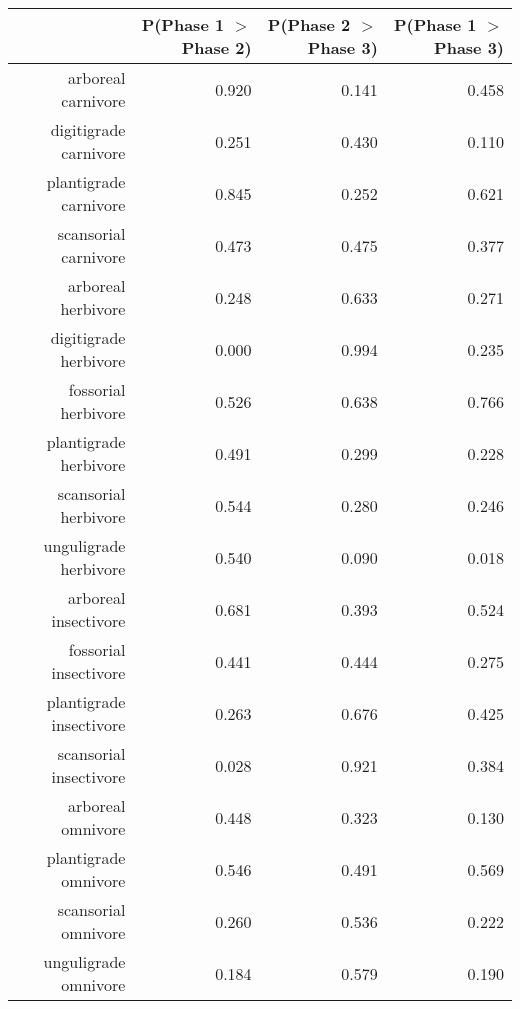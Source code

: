 \begin{table}[ht]
\centering
\begin{tabular}{rrrr}
  \hline
 & P(Phase 1 $>$ Phase 2) & P(Phase 2 $>$ Phase 3) & P(Phase 1 $>$ Phase 3) \\ 
  \hline
arboreal carnivore & 0.920 & 0.141 & 0.458 \\ 
  digitigrade carnivore & 0.251 & 0.430 & 0.110 \\ 
  plantigrade carnivore & 0.845 & 0.252 & 0.621 \\ 
  scansorial carnivore & 0.473 & 0.475 & 0.377 \\ 
  arboreal herbivore & 0.248 & 0.633 & 0.271 \\ 
  digitigrade herbivore & 0.000 & 0.994 & 0.235 \\ 
  fossorial herbivore & 0.526 & 0.638 & 0.766 \\ 
  plantigrade herbivore & 0.491 & 0.299 & 0.228 \\ 
  scansorial herbivore & 0.544 & 0.280 & 0.246 \\ 
  unguligrade herbivore & 0.540 & 0.090 & 0.018 \\ 
  arboreal insectivore & 0.681 & 0.393 & 0.524 \\ 
  fossorial insectivore & 0.441 & 0.444 & 0.275 \\ 
  plantigrade insectivore & 0.263 & 0.676 & 0.425 \\ 
  scansorial insectivore & 0.028 & 0.921 & 0.384 \\ 
  arboreal omnivore & 0.448 & 0.323 & 0.130 \\ 
  plantigrade omnivore & 0.546 & 0.491 & 0.569 \\ 
  scansorial omnivore & 0.260 & 0.536 & 0.222 \\ 
  unguligrade omnivore & 0.184 & 0.579 & 0.190 \\ 
   \hline
\end{tabular}
\label{tab:surv_plant}
\end{table}
